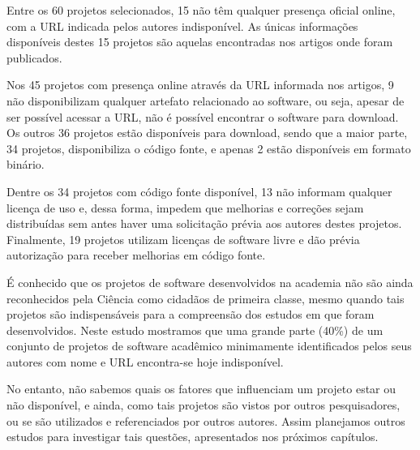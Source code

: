 Entre os 60 projetos selecionados, 15 não têm qualquer presença oficial online,
com a URL indicada pelos autores indisponível. As únicas informações
disponíveis destes 15 projetos são aquelas encontradas nos artigos onde foram
publicados.

Nos 45 projetos com presença online através da URL informada nos artigos, 9 não
disponibilizam qualquer artefato relacionado ao software, ou seja, apesar de
ser possível acessar a URL, não é possível encontrar o software para download.
Os outros 36 projetos estão disponíveis para download, sendo que
a maior parte, 34 projetos, disponibiliza o código fonte, e apenas 2
estão disponíveis em formato binário.

Dentre os 34 projetos com código fonte disponível, 13 não informam qualquer
licença de uso e, dessa forma, impedem que melhorias e correções
sejam distribuídas sem antes haver uma solicitação prévia aos autores destes
projetos. Finalmente, 19 projetos utilizam licenças de software livre e dão
prévia autorização para receber melhorias em código fonte.

É conhecido que os projetos de software desenvolvidos na academia não são ainda
reconhecidos pela Ciência como cidadãos de primeira classe, mesmo quando tais
projetos são indispensáveis para a compreensão dos estudos em que foram
desenvolvidos. Neste estudo mostramos que uma grande parte (40\%) de um
conjunto de projetos de software acadêmico minimamente identificados pelos seus
autores com nome e URL encontra-se hoje indisponível.

No entanto, não sabemos quais os fatores que influenciam um projeto estar ou não
disponível, e ainda, como tais projetos são vistos por outros pesquisadores, ou se
são utilizados e referenciados por outros autores. Assim planejamos outros
estudos para investigar tais questões, apresentados nos próximos capítulos.





